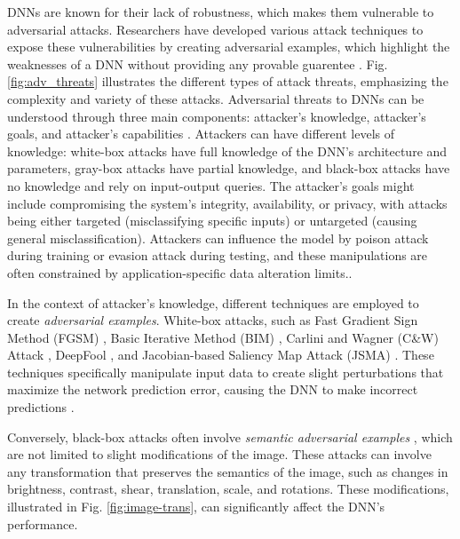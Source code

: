 DNNs are known for their lack of robustness, which makes them vulnerable to adversarial attacks. Researchers have developed various attack techniques to expose these vulnerabilities by creating adversarial examples, which highlight the weaknesses of a DNN without providing any provable guarentee \cite{HuangX}. Fig. \ref{fig:adv_threats}  illustrates the different types of attack threats, emphasizing the complexity and variety of these attacks. Adversarial threats to DNNs can be understood through three main components: attacker's knowledge, attacker's goals, and attacker's capabilities \cite{Biggio}.
Attackers can have different levels of knowledge: white-box attacks have full knowledge of the DNN's architecture and parameters, gray-box attacks have partial knowledge, and black-box attacks have no knowledge and rely on input-output queries. The attacker's goals might include compromising the system's integrity, availability, or privacy, with attacks being either targeted (misclassifying specific inputs) or untargeted (causing general misclassification). Attackers can influence the model by poison attack \cite{poisonattack,Badnets} during training or evasion attack \cite{evasion} during testing, and these manipulations are often constrained by application-specific data alteration limits.\cite{Chakraborty}.



In the context of attacker's knowledge, different techniques are employed to create \emph{adversarial examples}. White-box attacks, such as Fast Gradient Sign Method (FGSM) \cite{FGSM}, Basic Iterative Method (BIM) \cite{BIM}, Carlini and Wagner (C\&W) Attack \cite{Carlini}, DeepFool \cite{deepfool}, and Jacobian-based Saliency Map Attack (JSMA) \cite{JSMA}. These techniques specifically manipulate input data to create slight perturbations that maximize the network prediction error, causing the DNN to make incorrect predictions \cite{Hosseini}.

Conversely, black-box attacks often involve \emph{semantic adversarial examples} \cite{HuangX,deeptest,Engstrom,Pei}, which are not limited to slight modifications of the image. These attacks can involve any transformation that preserves the semantics of the image, such as changes in brightness, contrast, shear, translation, scale, and rotations. These modifications, illustrated in Fig. \ref{fig:image-trans}, can significantly affect the DNN's performance. 



\begin{center}
  \end{center}

